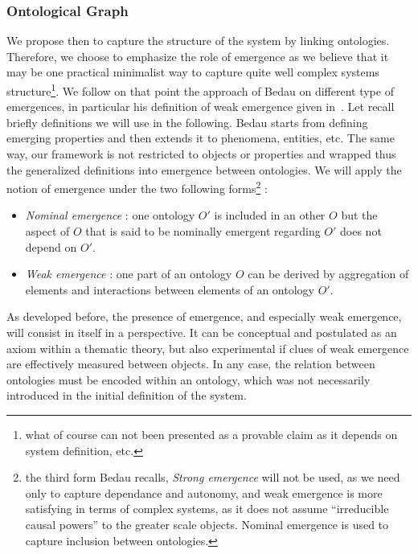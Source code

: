 \subsubsection*{Ontological Graph}


We propose then to capture the structure of the system by linking ontologies. %
Therefore, we choose to emphasize the role of emergence as we believe that it may be one practical minimalist way to capture quite well complex systems structure\footnote{what of course can not been presented as a provable claim as it depends on system definition, etc.}. We follow on that point the approach of Bedau on different type of emergences, in particular his definition of weak emergence given in~\cite{bedau2002downward}. Let recall briefly definitions we will use in the following. Bedau starts from defining emerging properties and then extends it to phenomena, entities, etc. The same way, our framework is not restricted to objects or properties and wrapped thus the generalized definitions into emergence between ontologies. We will apply the notion of emergence under the two following forms\footnote{the third form Bedau recalls, \emph{Strong emergence} will not be used, as we need only to capture dependance and autonomy, and weak emergence is more satisfying in terms of complex systems, as it does not assume ``irreducible causal powers'' to the greater scale objects. Nominal emergence is used to capture inclusion between ontologies.} :
\begin{itemize}
\item \emph{Nominal emergence} : one ontology $O'$ is included in an other $O$ but the aspect of $O$ that is said to be nominally emergent regarding $O'$ does not depend on $O'$.
\item \emph{Weak emergence} : one part of an ontology $O$ can be derived by aggregation of elements and interactions between elements of an ontology $O'$.
\end{itemize}

As developed before, the presence of emergence, and especially weak emergence, will consist in itself in a perspective. It can be conceptual and postulated as an axiom within a thematic theory, but also experimental if clues of weak emergence are effectively measured between objects. In any case, the relation between ontologies must be encoded within an ontology, which was not necessarily introduced in the initial definition of the system.



